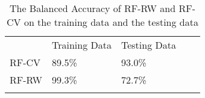 \begin{table}
    \centering
    \begin{tabular}{lllll}
    \cline{1-3}
    \multicolumn{1}{|l|}{}      & \multicolumn{1}{l|}{Training Data} & \multicolumn{1}{l|}{Testing Data} &  &  \\ \cline{1-3}
    \multicolumn{1}{|l|}{RF-CV} & \multicolumn{1}{l|}{89.5\%}         & \multicolumn{1}{l|}{93.0\%}        &  &  \\ \cline{1-3}
    \multicolumn{1}{|l|}{RF-RW} & \multicolumn{1}{l|}{99.3\%}         & \multicolumn{1}{l|}{72.7\%}        &  &  \\ \cline{1-3}
                                &                                    &                                   &  & 
    \end{tabular}
    \caption{The Balanced Accuracy of RF-RW and RF-CV on the training data and the testing data}
    \label{tab:overfit}
\end{table}